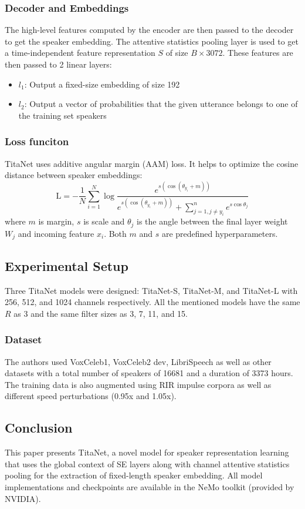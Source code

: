 \subsubsection{Decoder and Embeddings}
The high-level features computed by the encoder are then passed to the decoder to get the speaker embedding.
The attentive statistics pooling layer is used to get a time-independent feature representation $S$ of size $B \times 3072$.
These features are then passed to 2 linear layers:
\begin{itemize}
    \item $l_1$: Output a fixed-size embedding of size 192
    \item $l_2$: Output a vector of probabilities that the given utterance belongs to one of the training set speakers
\end{itemize}

\subsubsection{Loss funciton}
TitaNet uses additive angular margin (AAM) loss. It helps to optimize the cosine distance between speaker embeddings:
\begin{equation}
    \text{L} = - \frac{1}{N} \sum_{i=1}^{N} \log \frac{e^{s(\cos(\theta_{y_i} + m))}}{e^{s(\cos(\theta_{y_i} + m))} + \sum_{j=1, j \neq y_i}^{n} e^{s \cos \theta_{j}}}
\end{equation}
where $m$ is margin, $s$ is scale and $\theta_j$ is the angle between the final layer weight $W_j$ and incoming feature $x_i$.
Both $m$ and $s$ are predefined hyperparameters.

\subsection{Experimental Setup}
Three TitaNet models were designed: TitaNet-S, TitaNet-M, and TitaNet-L with 256, 512, and 1024 channels respectively.
All the mentioned models have the same $R$ as 3 and the same filter sizes as 3, 7, 11, and 15.
\subsubsection{Dataset}
The authors used VoxCeleb1\cite{Nagrani_2017_vox}, VoxCeleb2\cite{Chung_2018_vox} dev, LibriSpeech\cite{librispeech} as well as other datasets with a total number of speakers of 16681 and a duration of 3373 hours.
The training data is also augmented using RIR impulse corpora as well as different speed perturbations (0.95x and 1.05x).


\subsection{Conclusion}
This paper presents TitaNet, a novel model for speaker representation learning that uses the global context of SE layers along with channel attentive statistics pooling for the extraction of fixed-length speaker embedding.
All model implementations and checkpoints are available in the NeMo toolkit (provided by NVIDIA).